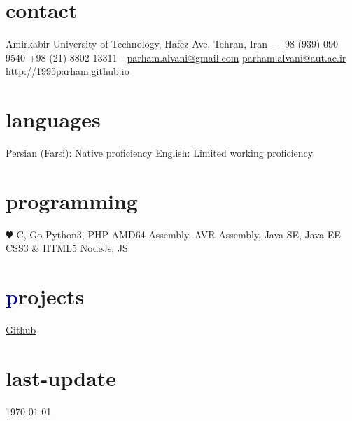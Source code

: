 \documentclass[]{friggeri-cv} %
\begin{document}


\begin{aside} %
\section{\textcolor{TextYellow}{c}ontact}
Amirkabir University of Technology,
Hafez Ave,
Tehran, Iran
-
+98 (939) 090 9540
+98 (21) 8802 13311
-
\href{mailto:parham.alvani@gmail.com}{parham.alvani@gmail.com}
\href{mailto:parham.alvani@aut.ac.ir}{parham.alvani@aut.ac.ir}
\href{http://1995parham.github.io/}{http://1995parham.github.io}
\section{\textcolor{TextOrange}{l}anguages}
Persian (Farsi):
Native proficiency
English:
Limited working proficiency
\section{\textcolor{TextGreen}{p}rogramming}
{\color{red} $\varheartsuit$} C, Go
Python3, PHP
AMD64 Assembly,
AVR Assembly,
Java SE, Java EE
CSS3 \& HTML5
NodeJs, JS
\section{\textcolor{DarkBlue}{p}rojects}
\href{https://github.com/1995parham}{\textcolor{TextGreen}{\faGithub} Github}
\section{\textcolor{Ocean}{last}-update}
\today
\end{aside}

\end{document}
